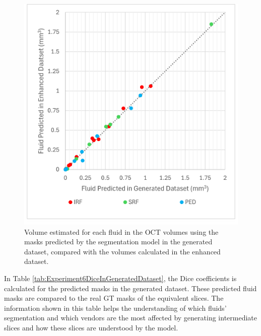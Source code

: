 \begin{figure}[!ht]
	\centering	\includegraphics[width=0.50\linewidth]{figures/Experiment6GeneratedVsEnhanced.png}
	\caption{Volume estimated for each fluid in the OCT volumes using the masks predicted by the segmentation model in the generated dataset, compared with the volumes calculated in the enhanced dataset.}
	\label{fig:Experiment6GeneratedVsEnhanced}
\end{figure}

In Table \ref{tab:Experiment6DiceInGeneratedDataset}, the Dice coefficients is calculated for the predicted masks in the generated dataset. These predicted fluid masks are compared to the real GT masks of the equivalent slices. The information shown in this table helps the understanding of which fluids' segmentation and which vendors are the most affected by generating intermediate slices and how these slices are understood by the model.


